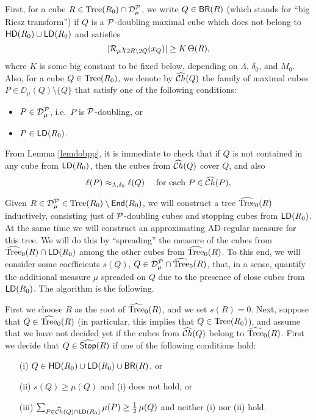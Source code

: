 First, for a cube 
$R\in{\rm Tree}(R_0)\cap{\mathcal D}_\mu^{\mathcal P}$, we write $Q\in {\mathsf {BR}}(R)$ (which stands for ``big Riesz transform'') if $Q$ is a ${\mathcal P}$-doubling maximal cube which does not belong to ${\mathsf{HD}}(R_0)\cup{\mathsf{LD}}(R_0)$ and satisfies
$$|{\mathcal R}_\mu\chi_{2R\setminus 2Q}(x_Q)|\geq K\,\Theta(R),$$
where $K$ is some big constant to be fixed below, depending on $\Lambda$, $\delta_0$, and $M_0$. Also, for a cube $Q\in{\rm Tree}(R_0)$,
we denote by ${\widehat{{\mathcal Ch}}}(Q)$ the family of maximal cubes $P\in\DD_\mu(Q)\setminus\{Q\}$ that satisfy one of the following conditions:
\begin{itemize} 
\item $P\in{\mathcal D}_\mu^{\mathcal P}$, i.e.\ $P$ is ${\mathcal P}$-doubling, or
\item $P\in{\mathsf{LD}}(R_0)$.
\end{itemize}
From Lemma \ref{lemdobpp}, it is immediate to check that if $Q$ is not contained in any cube from ${\mathsf{LD}}(R_0)$, then the cubes from ${\widehat{{\mathcal Ch}}}(Q)$
cover $Q$, and also 
\begin{equation}\label{eqcompa492}
\ell(P)\approx_{\Lambda,\delta_0}\ell(Q)\quad \mbox{ for each $P\in{\widehat{{\mathcal Ch}}}(P)$,} 
\end{equation}

Given $R\in{\mathcal D}_\mu^{\mathcal P}\in{\rm Tree}(R_0)\setminus {\mathsf{End}}(R_0)$, we will construct a tree ${\widehat{{\rm Tree}}}_0(R)$ inductively, consisting just of ${\mathcal P}$-doubling cubes and stopping cubes from ${\mathsf{LD}}(R_0)$. At the
same time we will construct an approximating AD-regular measure for this tree. We will do this by ``spreading''
the measure of the cubes from ${\widehat{{\rm Tree}}}_0(R)\cap {\mathsf{LD}}(R_0)$ among the other cubes from ${\widehat{{\rm Tree}}}_0(R)$. To this end, we will consider some coefficients $s(Q)$, $Q\in{\mathcal D}_\mu^{\mathcal P}\cap{\widehat{{\rm Tree}}}_0(R)$, that, in a sense, quantify the additional measure $\mu$ spreaded on $Q$
due to the presence of close cubes from ${\mathsf{LD}}(R_0)$. The algorithm is the following.

First we choose $R$ as the root of ${\widehat{{\rm Tree}}}_0(R)$, and we set $s(R)=0$. Next, suppose that $Q\in{\widehat{{\rm Tree}}}_0(R)$
(in particular, this implies that $Q\in{\rm Tree}(R_0)$), and assume that we have not 
decided yet if the cubes from ${\widehat{{\mathcal Ch}}}(Q)$ belong to ${\widehat{{\rm Tree}}}_0(R)$. 
First we decide that $Q\in{\widehat{{\mathsf {Stop}}}}(R)$ if one of the following conditions hold:
\begin{itemize}
\item[(i)] $Q\in{\mathsf{HD}}(R_0)\cup{\mathsf{LD}}(R_0)\cup{\mathsf {BR}}(R)$, or\vspace{1mm}

\item[(ii)] $s(Q)\geq \mu(Q)$ and (i) does not hold, or \vspace{1mm}

\item[(iii)] $\sum_{P\in{\widehat{{\mathcal Ch}}}(Q)\cap {\mathsf{LD}}(R_0)}\mu(P) \geq \frac12\,\mu(Q)$ and neither (i) nor (ii) hold.
\end{itemize}
\vspace{1mm}

